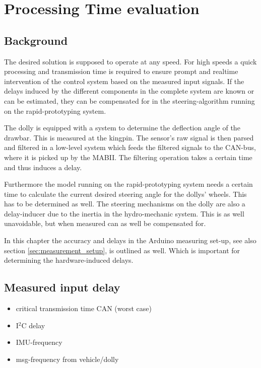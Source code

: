\documentclass[ExampleMasters.tex]{subfiles}
\begin{document}
\clearpage
\chapter{Processing Time evaluation}
\label{chap:processing_time_delay}
\section{Background}
The desired solution is supposed to operate at any speed. For high speeds a quick processing and transmission time is required to ensure prompt and realtime intervention of the control system based on the measured input signals. If the delays induced by the different components in the complete system are known or can be estimated, they can be compensated for in the steering-algorithm running on the rapid-prototyping system.

The dolly is equipped with a system to determine the deflection angle of the drawbar. This is measured at the kingpin. The sensor's raw signal is then parsed and filtered in a low-level system which feeds the filtered signals to the CAN-bus, where it is picked up by the MABII. The filtering operation takes a certain time and thus induces a delay. 

Furthermore the model running on the rapid-prototyping system needs a certain time to calculate the current desired steering angle for the dollys' wheels. This has to be determined as well. The steering mechanisms on the dolly are also a delay-inducer due to the inertia in the hydro-mechanic system. This is as well unavoidable, but when measured can as well be compensated for. 

In this chapter the accuracy and delays in the Arduino measuring set-up, see also section \ref{sec:measurement_setup}, is outlined as well. Which is important for determining the hardware-induced delays.


\section{Measured input delay}
\label{sec:measuring_delay}
\begin{itemize}
	\item critical transmission time CAN (worst case)
	\item I$^2$C delay
	\item IMU-frequency
	\item msg-frequency from vehicle/dolly
	
\end{itemize}
\end{document}
